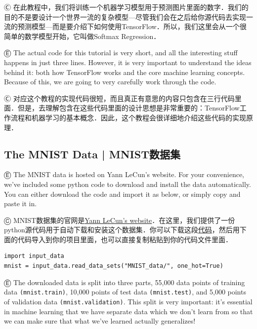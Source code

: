 Ⓒ 在此教程中，我们将训练一个机器学习模型用于预测图片里面的数字．我们的目的不是要设计一个世界一流的复杂模型---尽管我们会在之后给你源代码去实现一流的预测模型---而是要介绍下如何使用TensorFlow．所以，我们这里会从一个很简单的数学模型开始，它叫做Softmax Regression．

Ⓔ \textcolor{etc}{The actual code for this tutorial is very short, and all the interesting stuff happens in just three lines. However, it is very important to understand the ideas behind it: both how TensorFlow works and the core machine learning concepts. Because of this, we are going to very carefully work through the code.}

Ⓒ 对应这个教程的实现代码很短，而且真正有意思的内容只包含在三行代码里面．但是，去理解包含在这些代码里面的设计思想是非常重要的：TensorFlow工作流程和机器学习的基本概念．因此，这个教程会很详细地介绍这些代码的实现原理．

\subsection {The MNIST Data  |  MNIST数据集}

Ⓔ \textcolor{etc}{The MNIST data is hosted on Yann LeCun's website. For your convenience, we've included some python code to download and install the data automatically. You can either download the code and import it as below, or simply copy and paste it in.}

Ⓒ MNIST数据集的官网是\href{http://yann.lecun.com/exdb/mnist/}{Yann LeCun's website}．在这里，我们提供了一份python源代码用于自动下载和安装这个数据集．你可以下载这段\href{https://tensorflow.googlesource.com/tensorflow/+/master/tensorflow/examples/tutorials/mnist/input_data.py}{代码}，然后用下面的代码导入到你的项目里面，也可以直接复制粘贴到你的代码文件里面．


\begin{lstlisting}
import input_data
mnist = input_data.read_data_sets("MNIST_data/", one_hot=True)
\end{lstlisting}

Ⓔ \textcolor{etc}{The downloaded data is split into three parts, 55,000 data points of training data \lstinline{(mnist.train)}, 10,000 points of test data \lstinline{(mnist.test)}, and 5,000 points of validation data \lstinline{(mnist.validation)}. This split is very important: it's essential in machine learning that we have separate data which we don't learn from so that we can make sure that what we've learned actually generalizes!}

